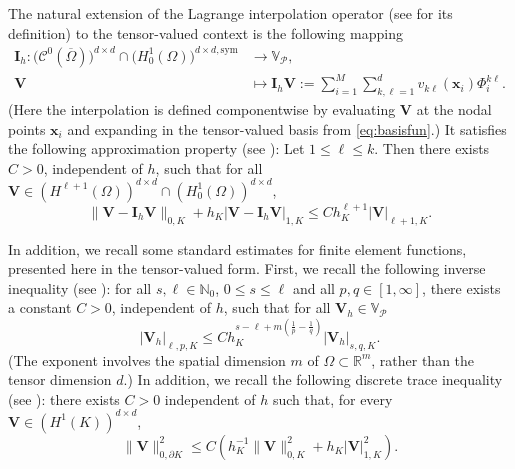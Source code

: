 \documentclass[final,12pt]{amsart}
\theoremstyle{plain}
\theoremstyle{definition}
\newcommand\bx{\boldsymbol{x}}
\newcommand\calP{{\mathcal{P}}}
\begin{document}
The natural extension of the Lagrange interpolation operator (see \cite[Chapter~11]{EG21-I} for its definition) to the tensor-valued context is the following mapping
 	\begin{align}
 		\mathbf{I}_{h}:\big(\mathcal{C}^{0}(\overline{\Omega})\big)^{d\times d}\cap \big( H^1_0(\Omega)\big)^{d\times d,\textrm{sym}}&\longrightarrow \mathbb{V}_{\mathcal{P}},\nonumber\\
 		\mathbf{V}&\longmapsto \mathbf{I}_{h}\mathbf{V}:= \sum_{i=1}^{M} \sum_{k,\ell=1}^{d} v_{k\ell}(\bx_i)\Phi^{k\ell}_{i} .\label{eq:componentwise_interpolation}
 	\end{align}
(Here the interpolation is defined componentwise by evaluating $\mathbf{V}$ at the nodal points $\bx_i$ and expanding in the tensor-valued basis from \eqref{eq:basisfun}.)
It satisfies the following approximation property (see \cite[Proposition~1.12]{EG21-I}): Let $1\leq \ell \leq k$. Then there exists $C>0$, 
independent of $h$, such that for all 
$\mathbf{V} \in (H^{\ell+1}(\Omega))^{d\times d}\cap (H^1_0(\Omega))^{d\times d}$,
\begin{equation}
	\|\mathbf{V}- \mathbf{I}_{h}\mathbf{V}\|_{0,K}
	+ h_{K} |\mathbf{V}-\mathbf{I}_{h}\mathbf{V}|_{1,K}
	\leq C h^{\ell +1}_{K}|\mathbf{V}|_{\ell +1,K}.
	\label{tensorlagrange}
\end{equation}

In addition, we recall some standard estimates for finite element functions, presented
here in the tensor-valued form. First, we recall the following inverse inequality
(see \cite[Lemma~12.1]{EG21-I}): for all $s,\ell\in \mathbb{N}_0$, $0\le s\leq \ell$ and all $p,q \in [1,\infty]$, 
there exists a constant $C>0$, independent of $h$, such that for all 
$\mathbf{V}_h \in \mathbb{V}_\calP$
\begin{equation}
	|\mathbf{V}_h|_{\ell,p,K} \leq 
	C h_K^{s-\ell+m\left(\frac{1}{p}-\frac{1}{q}\right)} |\mathbf{V}_h|_{s,q,K}.
	\label{inversetensor}
\end{equation}
(The exponent involves the spatial dimension $m$ of $\Omega\subset\mathbb{R}^m$, rather than the tensor dimension $d$.)
In addition, we recall the following discrete trace inequality (see \cite[Lemma~2.15]{EG21-I}): there exists $C>0$ independent of $h$ such that, for every 
$\mathbf{V} \in (H^1(K))^{d\times d}$,
\begin{equation}
	\|\mathbf{V}\|^{2}_{0,\partial K} 
	\leq C \left(h_K^{-1}\|\mathbf{V}\|^2_{0,K}+h_K |\mathbf{V}|^{2}_{1,K}\right).
	\label{Tensortrace}
\end{equation}
\end{document}
